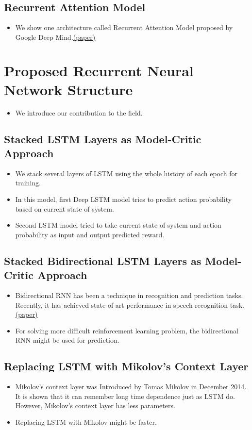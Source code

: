 \documentclass[officiallayout]{tktla}
\begin{document}
\section{Recurrent Attention Model}       
\begin{itemize}
\item We show one architecture called Recurrent Attention Model proposed by Google Deep Mind.\href{http://arxiv.org/pdf/1406.6247v1.pdf}{(paper)}
\end{itemize}

\chapter{Proposed Recurrent Neural Network Structure}
\begin{itemize}
\item We introduce our contribution to the field.
\end{itemize}
\section{Stacked LSTM Layers as Model-Critic Approach}
\begin{itemize}
\item We stack several layers of LSTM using the whole history of each epoch for training.
\item In this model, first Deep LSTM model tries to predict action probability based on current state of system.
\item Second LSTM model tried to take current state of system and action probability as input and output predicted reward.
\end{itemize}
\section{Stacked Bidirectional LSTM Layers as Model-Critic Approach}
\begin{itemize}
\item Bidirectional RNN has been a technique in recognition and prediction tasks. Recently, it has achieved state-of-art performance in speech recognition task.\href{http://arxiv.org/pdf/1412.5567v2.pdf}{(paper)}
\item For solving more difficult reinforcement learning problem, the bidirectional RNN might be used for prediction.

\end{itemize}
\section{Replacing LSTM with Mikolov's Context Layer}
\begin{itemize}
\item Mikolov's context layer was Introduced by Tomas Mikolov in December 2014. It is shown that it can remember long time dependence just as LSTM do. However, Mikolov's context layer has less parameters.
\item Replacing LSTM with Mikolov might be faster.
\end{itemize}
\end{document}
